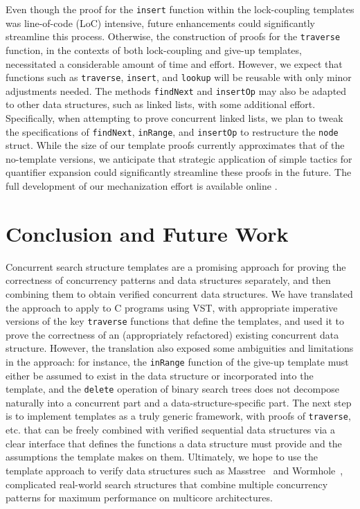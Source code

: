 \documentclass[a4paper,UKenglish,cleveref, autoref, thm-restate]{lipics-v2021}
\newcommand{\wm}[1]{\textbf{\textcolor{violet}{[William: #1]}}}
\begin{document}
Even though the proof for the \texttt{insert} function within the lock-coupling templates was line-of-code (LoC) intensive, future enhancements could significantly streamline this process. Otherwise, the construction of proofs for the \texttt{traverse} function, in the contexts of both lock-coupling and give-up templates, necessitated a considerable amount of time and effort.
However, we expect that functions such as \texttt{traverse}, \texttt{insert}, and \texttt{lookup} will be reusable with only minor adjustments needed.  The methods \texttt{findNext} and \texttt{insertOp} may also be adapted to other data structures, such as linked lists, with some additional effort. 
Specifically, when attempting to prove concurrent linked lists, we plan to tweak the specifications of \texttt{findNext}, \texttt{inRange}, and \texttt{insertOp} to restructure the \texttt{node} struct. While the size of our template proofs currently approximates that of the no-template versions, we anticipate that strategic application of simple tactics for quantifier expansion could significantly streamline these proofs in the future. The full development of our mechanization effort is available online
\href{https://github.com/PrincetonUniversity/DeepSpecDB/tree/master/concurrency/templates}{\color{blue}{https://github.com/PrincetonUniversity/DeepSpecDB/tree/master/concurrency/templates}}.

\section{Conclusion and Future Work}
Concurrent search structure templates are a promising approach for proving the correctness of concurrency patterns and data structures separately, and then combining them to obtain verified concurrent data structures. We have translated the approach to apply to C programs using VST, with appropriate imperative versions of the key \lstinline{traverse} functions that define the templates, and used it to prove the correctness of an (appropriately refactored) existing concurrent data structure. However, the translation also exposed some ambiguities and limitations in the approach: for instance, the \lstinline{inRange} function of the give-up template must either be assumed to exist in the data structure or incorporated into the template, and the \lstinline{delete} operation of binary search trees does not decompose naturally into a concurrent part and a data-structure-specific part.  %
The next step is to implement templates as a truly generic framework, with proofs of \lstinline{traverse}, etc. that can be freely combined with verified sequential data structures via a clear interface that defines the functions a data structure must provide and the assumptions the template makes on them.
Ultimately, we hope to use the template approach to verify data structures such as Masstree~\cite{masstree} and Wormhole~\cite{wormhole}, complicated real-world search structures that combine multiple concurrency patterns for maximum performance on multicore architectures.
\end{document}
